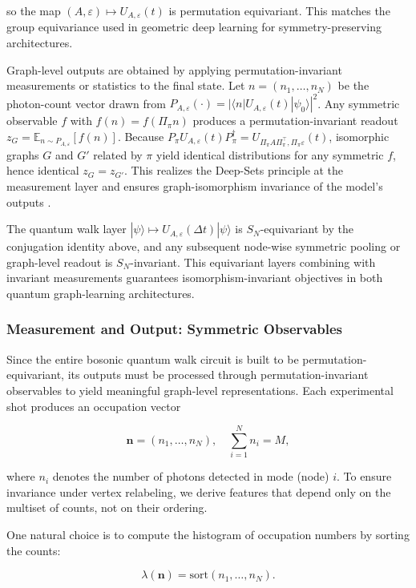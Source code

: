 \documentclass[11pt]{article}
\begin{document}
so the map $(A,\varepsilon)\mapsto U_{A,\varepsilon}(t)$ is permutation equivariant. This matches the group equivariance used in geometric deep learning for symmetry-preserving architectures.

Graph-level outputs are obtained by applying permutation-invariant measurements or statistics to the final state. Let $n=(n_1,\dots,n_N)$ be the photon-count vector drawn from $P_{A,\varepsilon}(\cdot)=|\langle n|U_{A,\varepsilon}(t)|\psi_0\rangle|^2$. Any symmetric observable $f$ with $f(n)=f(\Pi_\pi n)$ produces a permutation-invariant readout $z_G=\mathbb{E}_{n\sim P_{A,\varepsilon}}[f(n)]$. Because $P_\pi U_{A,\varepsilon}(t)P_\pi^\dagger=U_{\Pi_\pi A \Pi_\pi^\top,\Pi_\pi \varepsilon}(t)$, isomorphic graphs $G$ and $G'$ related by $\pi$ yield identical distributions for any symmetric $f$, hence identical $z_G=z_{G'}$. This realizes the Deep-Sets principle at the measurement layer and ensures graph-isomorphism invariance of the model's outputs \citep{zaheer2017deepsets}.

The quantum walk layer $|\psi\rangle\mapsto U_{A,\varepsilon}(\Delta t)|\psi\rangle$ is $S_N$-equivariant by the conjugation identity above, and any subsequent node-wise symmetric pooling or graph-level readout is $S_N$-invariant. This equivariant layers combining with invariant measurements guarantees isomorphism-invariant objectives in both quantum graph-learning architectures.

\subsubsection{Measurement and Output: Symmetric Observables}

Since the entire bosonic quantum walk circuit is built to be permutation-equivariant, its outputs must be processed through permutation-invariant observables to yield meaningful graph-level representations. Each experimental shot produces an occupation vector

$$
\mathbf{n} = (n_1, \dots, n_N), \quad \sum_{i=1}^N n_i = M,
$$

where $n_i$ denotes the number of photons detected in mode (node) $i$. To ensure invariance under vertex relabeling, we derive features that depend only on the multiset of counts, not on their ordering.

One natural choice is to compute the histogram of occupation numbers by sorting the counts:

$$
\lambda(\mathbf{n}) = \mathrm{sort}(n_1, \dots, n_N).
$$
\end{document}
